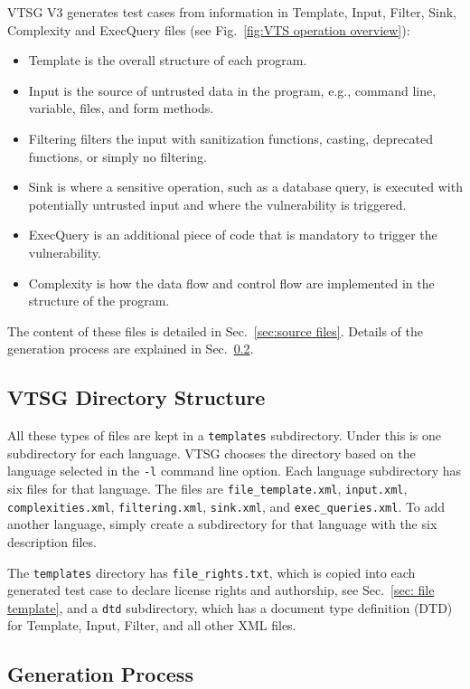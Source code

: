 \documentclass[12pt]{article}
\begin{document}
VTSG V3 generates test cases from information in Template, Input,
Filter, Sink, Complexity and ExecQuery files 
(see Fig.~\ref{fig:VTS operation overview}):
\begin{itemize}
 \item Template is the overall structure of each program.
 \item Input is the source of untrusted data in the program, e.g., 
 command line, variable, files, and form methods.
 \item Filtering filters the input with sanitization functions, 
 casting, deprecated functions, or simply no filtering.
 \item Sink is where a sensitive operation, such as a database query, 
 is executed with potentially untrusted input and where the 
 vulnerability is triggered.
 \item ExecQuery is an additional piece of code that is mandatory to 
 trigger the vulnerability.
 \item Complexity is how the data flow and control flow are 
 implemented in the structure of the program.
\end{itemize}
The content of these files is detailed in
Sec.~\ref{sec:source files}.
Details of the generation process are explained in
Sec.~\ref{sec: generation detail}.

\subsection{VTSG Directory Structure}
\label{sec: directory structure}

All these types of files are kept in a \verb|templates| subdirectory.
Under this is one subdirectory for each language.  VTSG chooses the
directory based on the language selected in the \verb|-l| command line
option.  Each language subdirectory has six files for that language.
The files are \verb|file_template.xml|, \verb|input.xml|, 
\verb|complexities.xml|, \verb|filtering.xml|, \verb|sink.xml|,
and \verb|exec_queries.xml|.  To add another language,
simply create a subdirectory for that language with the six description
files.

The \verb|templates| directory has \verb|file_rights.txt|, which is
copied into each generated test case to declare license rights and
authorship, see Sec.~\ref{sec: file template}, and a 
\verb|dtd| subdirectory, which has a document type definition (DTD) 
for Template, Input, Filter, and all other XML files.


\subsection{Generation Process}
\label{sec: generation detail}
\end{document}
